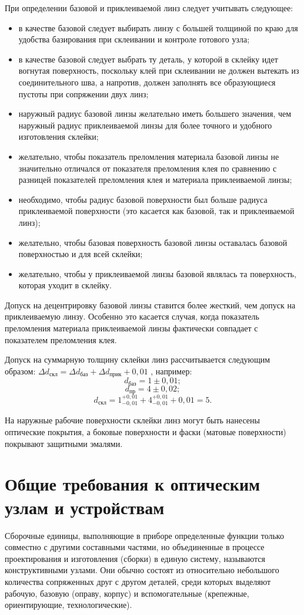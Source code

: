 При определении базовой и приклеиваемой линз следует учитывать следующее:
\begin{itemize}
	\item в качестве базовой следует выбирать линзу с большей толщиной по краю для удобства базирования при склеивании и контроле готового узла;
	\item в качестве базовой следует выбрать ту деталь, у которой в склейку идет вогнутая поверхность, поскольку клей при склеивании не должен вытекать из соединительного шва, а напротив, должен заполнять все образующиеся пустоты при сопряжении двух линз;
	\item наружный радиус базовой линзы желательно иметь большего значения, чем наружный радиус приклеиваемой линзы для более точного и удобного изготовления склейки;
	\item желательно, чтобы показатель преломления материала базовой линзы не значительно отличался от показателя преломления клея по сравнению с разницей показателей преломления клея и материала приклеиваемой линзы;
	\item необходимо, чтобы радиус базовой поверхности был больше радиуса приклеиваемой поверхности (это касается как базовой, так и приклеиваемой линз);
	\item желательно, чтобы базовая поверхность базовой линзы оставалась базовой поверхностью и для всей склейки;
	\item желательно, чтобы у приклеиваемой линзы базовой являлась та поверхность, которая уходит в склейку.
\end{itemize}

Допуск на децентрировку базовой линзы ставится более жесткий, чем допуск на приклеиваемую линзу. Особенно это касается случая, когда показатель преломления материала приклеиваемой линзы фактически совпадает с показателем преломления клея.

Допуск на суммарную толщину склейки линз рассчитывается следующим образом: $ \Delta d_\text{скл} = \Delta d_\text{баз} + \Delta d_\text{прик} + 0,01$ , например:
\[ d_\text{баз} = 1 \pm 0,01; \]  
\[ d_\text{пр} = 4 \pm 0,02; \] 
\[ d_\text{скл} = 1_{-0,01}^{+0,01}  + 4_{-0,01}^{+0,01} + 0,01 = 5. \]

На наружные рабочие поверхности склейки линз могут быть нанесены оптические покрытия, а боковые поверхности и фаски (матовые поверхности) покрывают защитными эмалями.

\section{Общие требования к оптическим узлам и устройствам}
Сборочные единицы, выполняющие в приборе определенные функции только совместно с другими составными частями, но объединенные в процессе проектирования и изготовления (сборки) в единую систему, называются конструктивными узлами. Они обычно состоят из относительно небольшого количества сопряженных друг с другом деталей, среди которых выделяют рабочую, базовую (оправу, корпус) и вспомогательные (крепежные, ориентирующие, технологические). 

